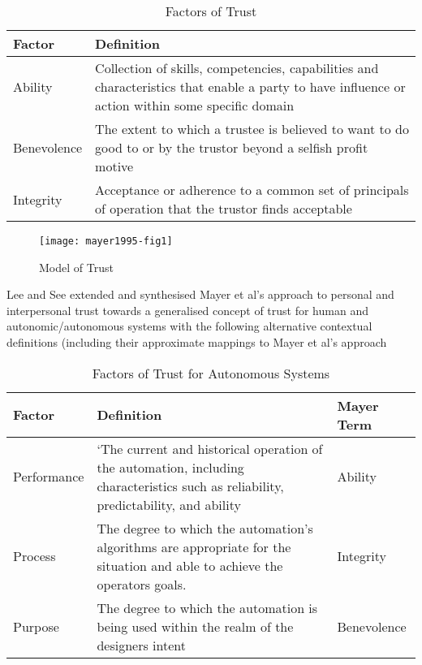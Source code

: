 \begin{table}\centering
  \caption[Factors of Trust]{Factors of Trust\cite{Mayer1995}}
  \label{tab:trust_factors}
  \begin{tabularx}{\textwidth}{p{2cm}X}\toprule
    Factor & Definition \\ \midrule
    Ability & Collection of skills, competencies, capabilities and characteristics that enable a party to have influence or action within some specific domain \\
    Benevolence & The extent to which a trustee is believed to want to do good to or by the trustor beyond a selfish profit motive\\
    Integrity & Acceptance or adherence to a common set of principals of operation that the trustor finds acceptable\\
    \bottomrule
  \end{tabularx}
\end{table}

\begin{figure}
  \texttt{[image: mayer1995-fig1]}
  \caption[Model of Trust]{Model of Trust \cite{Mayer1995}}
  \label{fig:mayer_trust_model}
\end{figure}
Lee and See \cite{Lee2004} extended and synthesised Mayer et al's approach to personal and interpersonal trust towards a generalised concept of trust for human and autonomic/autonomous systems with the following alternative contextual definitions (including their approximate mappings to Mayer et al's approach
\begin{table}
  \caption[Factors of Trust for Autonomous Systems]{Factors of Trust for Autonomous Systems\cite{Lee2004}}
  \label{tab:autonomous_trust_factors}
  \begin{tabularx}{\textwidth}{p{2cm}X p{2cm}}\toprule
    Factor & Definition & Mayer Term\\ \midrule
    Performance & `The current and historical operation of the automation, including characteristics such as reliability, predictability, and ability & Ability\\
    Process & The degree to which the automation's algorithms are appropriate for the situation and able to achieve the operators goals.
    & Integrity\\
    Purpose & The degree to which the automation is being used within the realm of the designers intent & Benevolence \\
    \bottomrule
  \end{tabularx}
\end{table}


